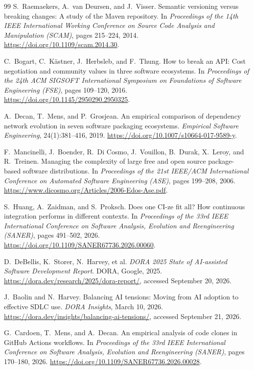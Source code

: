 \begin{thebibliography}{99}
S.~Raemaekers, A.~van Deursen, and J.~Visser.
Semantic versioning versus breaking changes: A study of the Maven
repository.
In \emph{Proceedings of the 14th IEEE International Working Conference
on Source Code Analysis and Manipulation (SCAM)}, pages 215--224, 2014.
\url{https://doi.org/10.1109/scam.2014.30}.

C.~Bogart, C.~K\"astner, J.~Herbsleb, and F.~Thung.
How to break an API: Cost negotiation and community values in three
software ecosystems.
In \emph{Proceedings of the 24th ACM SIGSOFT International Symposium on
Foundations of Software Engineering (FSE)}, pages 109--120, 2016.
\url{https://doi.org/10.1145/2950290.2950325}.

A.~Decan, T.~Mens, and P.~Grosjean.
An empirical comparison of dependency network evolution in seven
software packaging ecosystems.
\emph{Empirical Software Engineering}, 24(1):381--416, 2019.
\url{https://doi.org/10.1007/s10664-017-9589-y}.

F.~Mancinelli, J.~Boender, R.~Di Cosmo, J.~Vouillon, B.~Durak,
X.~Leroy, and R.~Treinen.
Managing the complexity of large free and open source package-based
software distributions.
In \emph{Proceedings of the 21st IEEE/ACM International Conference on
Automated Software Engineering (ASE)}, pages 199--208, 2006.
\url{https://www.dicosmo.org/Articles/2006-Edos-Ase.pdf}.

S.~Huang, A.~Zaidman, and S.~Proksch.
Does one CI-ze fit all? How continuous integration performs in different
contexts.
In \emph{Proceedings of the 33rd IEEE International Conference on Software
Analysis, Evolution and Reengineering (SANER)}, pages 491--502, 2026.
\url{https://doi.org/10.1109/SANER67736.2026.00060}.

D.~DeBellis, K.~Storer, N.~Harvey, et al.
\emph{DORA 2025 State of AI-assisted Software Development Report}.
DORA, Google, 2025.
\url{https://dora.dev/research/2025/dora-report/}, accessed September 20, 2026.

J.~Baolin and N.~Harvey.
Balancing AI tensions: Moving from AI adoption to effective SDLC use.
\emph{DORA Insights}, March 10, 2026.
\url{https://dora.dev/insights/balancing-ai-tensions/}, accessed September 21, 2026.

G.~Cardoen, T.~Mens, and A.~Decan.
An empirical analysis of code clones in GitHub Actions workflows.
In \emph{Proceedings of the 33rd IEEE International Conference on Software
Analysis, Evolution and Reengineering (SANER)}, pages 170--180, 2026.
\url{https://doi.org/10.1109/SANER67736.2026.00028}.


\end{thebibliography}
